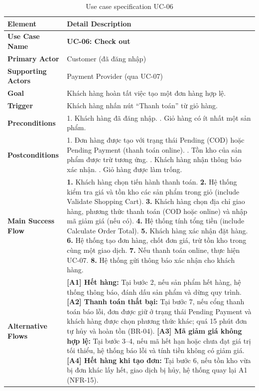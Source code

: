 \documentclass[12pt,a4paper,oneside]{report}
\begin{document}
\begin{longtable}{p{4cm}p{11.8cm}}
\caption{Use case specification UC-06}\\
\toprule
\textbf{Element} & \textbf{Detail Description} \\
\midrule
\endhead
\bottomrule
\endlastfoot
\textbf{Use Case Name} & \textbf{UC-06: Check out} \\
\textbf{Primary Actor} & Customer (đã đăng nhập) \\
\textbf{Supporting Actors} & Payment Provider (qua UC-07) \\
\textbf{Goal} & Khách hàng hoàn tất việc tạo một đơn hàng hợp lệ. \\
\textbf{Trigger} & Khách hàng nhấn nút ``Thanh toán'' từ giỏ hàng. \\
\textbf{Preconditions} & 1. Khách hàng đã đăng nhập. \newline 2. Giỏ hàng có ít nhất một sản phẩm. \\
\textbf{Postconditions} & 1. Đơn hàng được tạo với trạng thái Pending (COD) hoặc Pending Payment (thanh toán online). \newline 2. Tồn kho của sản phẩm được trừ tương ứng. \newline 3. Khách hàng nhận thông báo xác nhận. \newline 4. Giỏ hàng được làm trống. \\
\textbf{Main Success Flow} & \textbf{1.} Khách hàng chọn tiến hành thanh toán. \newline \textbf{2.} Hệ thống kiểm tra giá và tồn kho các sản phẩm trong giỏ (include Validate Shopping Cart). \newline \textbf{3.} Khách hàng chọn địa chỉ giao hàng, phương thức thanh toán (COD hoặc online) và nhập mã giảm giá (nếu có). \newline \textbf{4.} Hệ thống tính tổng tiền (include Calculate Order Total). \newline \textbf{5.} Khách hàng xác nhận đặt hàng. \newline \textbf{6.} Hệ thống tạo đơn hàng, chốt đơn giá, trừ tồn kho trong cùng một giao dịch. \newline \textbf{7.} Nếu thanh toán online, thực hiện UC-07. \newline \textbf{8.} Hệ thống gửi thông báo xác nhận cho khách hàng. \\
\textbf{Alternative Flows} & \textbf{[A1] Hết hàng:} Tại bước 2, nếu sản phẩm hết hàng, hệ thống thông báo, đánh dấu sản phẩm và dừng quy trình. \newline \textbf{[A2] Thanh toán thất bại:} Tại bước 7, nếu cổng thanh toán báo lỗi, đơn được giữ ở trạng thái Pending Payment và khách hàng được chọn phương thức khác; quá 15 phút đơn tự hủy và hoàn tồn (BR-04). \newline \textbf{[A3] Mã giảm giá không hợp lệ:} Tại bước 3--4, nếu mã hết hạn hoặc chưa đạt giá trị tối thiểu, hệ thống báo lỗi và tính tiền không có giảm giá. \newline \textbf{[A4] Hết hàng khi tạo đơn:} Tại bước 6, nếu tồn kho vừa bị đơn khác lấy hết, giao dịch bị hủy, hệ thống quay lại A1 (NFR-15). \\
\end{longtable}
\end{document}
